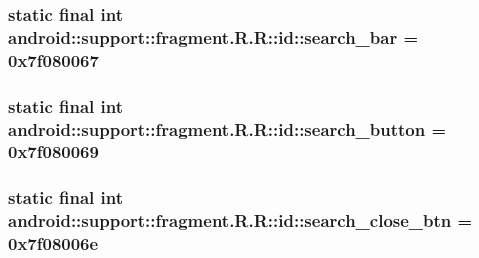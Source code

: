 \hypertarget{classandroid_1_1support_1_1fragment_1_1_r_1_1id_1e962e6593ef0648bae524ddc5746da5}{
\subsubsection[{search\_\-bar}]{\setlength{\rightskip}{0pt plus 5cm}static final int android::support::fragment.R.R::id::search\_\-bar = 0x7f080067}}
\label{classandroid_1_1support_1_1fragment_1_1_r_1_1id_1e962e6593ef0648bae524ddc5746da5}


\hypertarget{classandroid_1_1support_1_1fragment_1_1_r_1_1id_b76f818f0c52be469ae56d2683f06970}{
\subsubsection[{search\_\-button}]{\setlength{\rightskip}{0pt plus 5cm}static final int android::support::fragment.R.R::id::search\_\-button = 0x7f080069}}
\label{classandroid_1_1support_1_1fragment_1_1_r_1_1id_b76f818f0c52be469ae56d2683f06970}


\hypertarget{classandroid_1_1support_1_1fragment_1_1_r_1_1id_5d872d6cbaf6e427b64eba1bb1b48fac}{
\subsubsection[{search\_\-close\_\-btn}]{\setlength{\rightskip}{0pt plus 5cm}static final int android::support::fragment.R.R::id::search\_\-close\_\-btn = 0x7f08006e}}
\label{classandroid_1_1support_1_1fragment_1_1_r_1_1id_5d872d6cbaf6e427b64eba1bb1b48fac}


